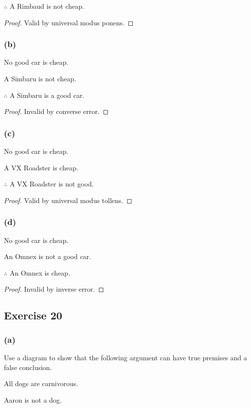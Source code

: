 \documentclass[14pt]{extarticle}
\begin{document}
$\therefore$ A Rimbaud is not cheap.

\begin{proof}
    Valid by universal modus ponens.
\end{proof}

\subsubsection{(b)}
No good car is cheap.

A Simbaru is not cheap.

$\therefore$ A Simbaru is a good car.

\begin{proof}
    Invalid by converse error.
\end{proof}

\subsubsection{(c)}
No good car is cheap.

A VX Roadster is cheap.

$\therefore$ A VX Roadster is not good.

\begin{proof}
    Valid by universal modus tollens.
\end{proof}

\subsubsection{(d)}
No good car is cheap.

An Omnex is not a good car.

$\therefore$ An Omnex is cheap.

\begin{proof}
    Invalid by inverse error.
\end{proof}

\subsection{Exercise 20}

\subsubsection{(a)}
Use a diagram to show that the following argument can have true premises and a false conclusion.

All dogs are carnivorous.

Aaron is not a dog.
\end{document}
